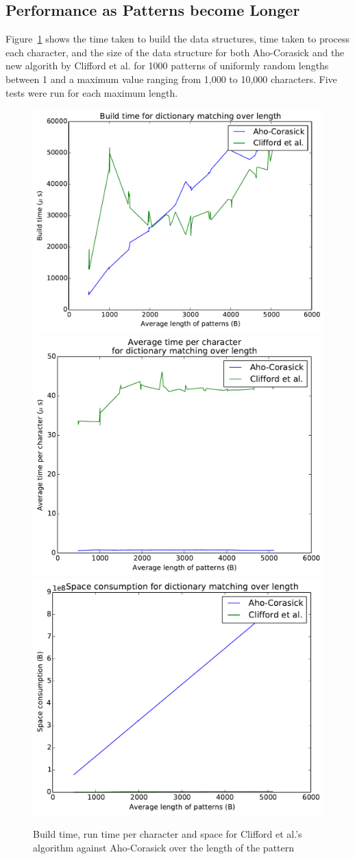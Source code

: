 \documentclass[ %
                    author={Dominic Joseph Moylett},
                    degree={MEng},
                     title={Dictionary Matching with Fingerprints},
                  subtitle={An Empirical Analysis},
                      type={research},
                      year={2015} ]{dissertation}
\begin{document}
\subsection{Performance as Patterns become Longer}
\label{ssec:long-pattern-results}

Figure~\ref{fig:long-pattern-results} shows the time taken to build the data structures, time taken to process each character, and the size of the data structure for both Aho-Corasick and the new algorith by Clifford et al. for 1000 patterns of uniformly random lengths between 1 and a maximum value ranging from 1,000 to 10,000 characters. Five tests were run for each maximum length.

\begin{figure}[t]
\begin{center}
  \includegraphics[width=0.5\linewidth]{build_length_1000_10000}\\
  \includegraphics[width=0.5\linewidth]{time_length_1000_10000}\includegraphics[width=0.5\linewidth]{size_length_1000_10000}
\end{center}
\caption{Build time, run time per character and space for Clifford et al.'s algorithm against Aho-Corasick over the length of the pattern}
\label{fig:long-pattern-results}
\end{figure}
\end{document}
